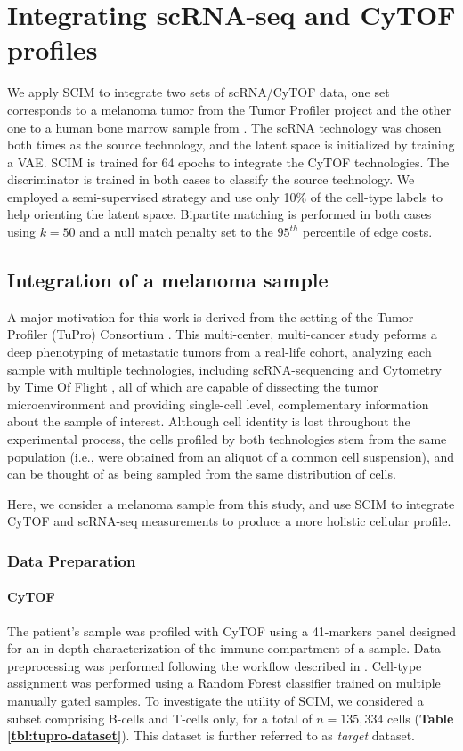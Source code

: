 \section{Integrating scRNA-seq and CyTOF profiles}


We apply SCIM to integrate two sets of scRNA/CyTOF data,
one set corresponds to a melanoma tumor from the Tumor Profiler project \cite{Irmisch2020}
and the other one to a human bone marrow sample from \citet{Oetjen2018}.
The scRNA technology was chosen both times as the source technology, and the latent space is initialized by training a VAE.
SCIM is trained for 64 epochs to integrate the CyTOF technologies.
The discriminator is trained in both cases to classify the source technology.
We employed a semi-supervised strategy and use only 10\% of the cell-type labels to help orienting the latent space.
Bipartite matching is performed in both cases using $k=50$ and a null match penalty set to the $95^{th}$ percentile of edge costs.


\subsection{Integration of a melanoma sample}
A major motivation for this work is derived from the setting of the Tumor Profiler (TuPro) Consortium \cite{Irmisch2020}.
This multi-center, multi-cancer study peforms a deep phenotyping of metastatic tumors from a real-life cohort, 
analyzing each sample with multiple technologies, including scRNA-sequencing \cite{Tang2009} and Cytometry by Time Of Flight \cite[CyTOF]{Bandura2009},
all of which are capable of dissecting the tumor microenvironment and providing single-cell level, complementary information about the sample of interest.
Although cell identity is lost throughout the experimental process, the cells profiled by both technologies stem from the same population
(i.e., were obtained from an aliquot of a common cell suspension), and can be thought of as being sampled from the same distribution of cells.

Here, we consider a melanoma sample from this study, and use SCIM to integrate CyTOF and scRNA-seq measurements to produce a more holistic cellular profile.

\subsubsection{Data Preparation}
\paragraph{CyTOF}
The patient's sample was profiled with CyTOF using a 41-markers panel designed for an in-depth characterization of the immune compartment of a sample.
Data preprocessing was performed following the workflow described in \cite{Chevrier2017, Chevrier2018}.
Cell-type assignment was performed using a Random Forest classifier trained on multiple manually gated samples.
To investigate the utility of SCIM, we considered a subset comprising B-cells and T-cells only, for a total of $n{=}135,334$ cells (\textbf{Table \ref{tbl:tupro-dataset}}).
This dataset is further referred to as \textit{target} dataset.

